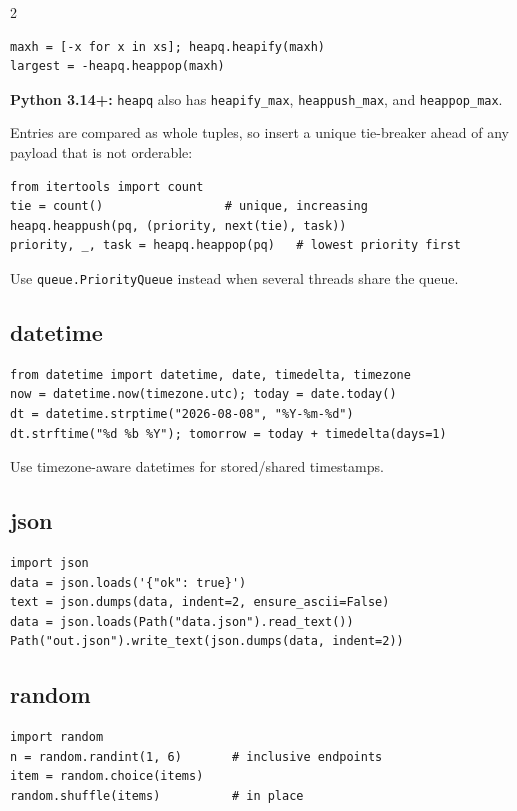 \documentclass[10pt,a4paper]{article}
\newcommand{\py}[1]{\texttt{#1}}
\begin{document}
\begin{multicols}{2}
\begin{lstlisting}
maxh = [-x for x in xs]; heapq.heapify(maxh)
largest = -heapq.heappop(maxh)
\end{lstlisting}

\textbf{Python 3.14+:} \py{heapq} also has \py{heapify\_max}, \py{heappush\_max}, and \py{heappop\_max}.

Entries are compared as whole tuples, so insert a unique tie-breaker ahead of any payload that is not orderable:

\begin{lstlisting}
from itertools import count
tie = count()                 # unique, increasing
heapq.heappush(pq, (priority, next(tie), task))
priority, _, task = heapq.heappop(pq)   # lowest priority first
\end{lstlisting}

Use \py{queue.PriorityQueue} instead when several threads share the queue.

\subsection{datetime}

\begin{lstlisting}
from datetime import datetime, date, timedelta, timezone
now = datetime.now(timezone.utc); today = date.today()
dt = datetime.strptime("2026-08-08", "%Y-%m-%d")
dt.strftime("%d %b %Y"); tomorrow = today + timedelta(days=1)
\end{lstlisting}

Use timezone-aware datetimes for stored/shared timestamps.

\subsection{json}

\begin{lstlisting}
import json
data = json.loads('{"ok": true}')
text = json.dumps(data, indent=2, ensure_ascii=False)
data = json.loads(Path("data.json").read_text())
Path("out.json").write_text(json.dumps(data, indent=2))
\end{lstlisting}

\subsection{random}

\begin{lstlisting}
import random
n = random.randint(1, 6)       # inclusive endpoints
item = random.choice(items)
random.shuffle(items)          # in place
\end{lstlisting}


\end{multicols}
\end{document}
